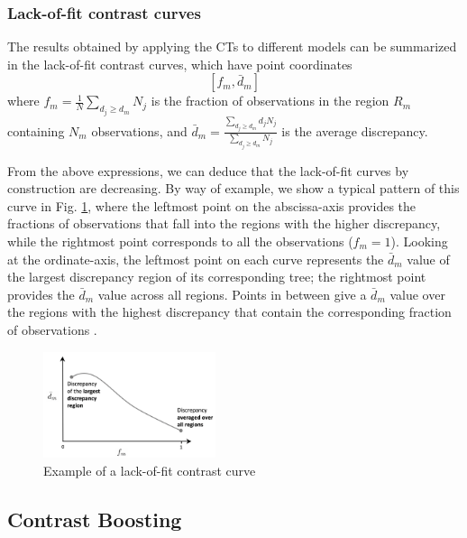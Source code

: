 \documentclass[fleqn,10pt]{wlscirep}
\begin{document}
\subsubsection*{Lack-of-fit contrast curves}

The results obtained by applying the CTs to different models can be summarized in the lack-of-fit contrast curves, which have point coordinates 
$$[f_m,\bar{d}_m]$$
where $f_m=\frac{1}{N}\sum_{d_j\geq d_m}N_j$ is the fraction of observations in the region $R_m$ containing $N_m$ observations, and $\bar{d}_m=\frac{\sum_{d_j\geq d_m}d_j N_j}{\sum_{d_j\geq d_m}N_j}$ is the average discrepancy.

From the above expressions, we can deduce that the lack-of-fit curves by construction are decreasing. By way of example, we show a typical pattern of this curve in Fig. \ref{fig:lof-ex}, where the leftmost point on the abscissa-axis provides the fractions of observations that fall into the regions with the higher discrepancy, while the rightmost point corresponds to all the observations ($f_m=1$).
Looking at the ordinate-axis, the leftmost point on each curve represents the $\bar{d}_m$ value of the largest discrepancy region of its corresponding tree; the rightmost point provides the $\bar{d}_m$ value across all regions. Points in between give a $\bar{d}_m$ value over the regions with the highest discrepancy that contain the corresponding fraction of observations \cite{Friedman2020}.
\begin{figure}[ht]
\centering
\includegraphics[width=0.45\textwidth]{lof_example.png}
\caption{Example of a lack-of-fit contrast curve}
\label{fig:lof-ex}
\end{figure}

\subsection*{Contrast Boosting}
\end{document}
